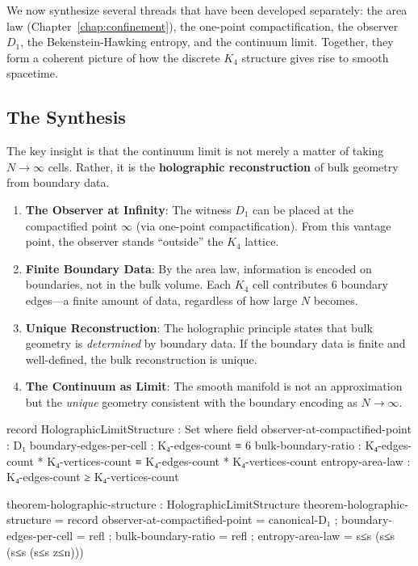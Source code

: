 \documentclass[11pt,a4paper]{book}
\begin{document}
We now synthesize several threads that have been developed separately: the area law 
(Chapter~\ref{chap:confinement}), the one-point compactification, the observer $D_1$, 
the Bekenstein-Hawking entropy, and the continuum limit. Together, they form a coherent 
picture of how the discrete $K_4$ structure gives rise to smooth spacetime.

\subsection{The Synthesis}

The key insight is that the continuum limit is not merely a matter of taking $N \to \infty$ 
cells. Rather, it is the \textbf{holographic reconstruction} of bulk geometry from boundary data.

\begin{enumerate}
\item \textbf{The Observer at Infinity}: The witness $D_1$ can be placed at the compactified 
point $\infty$ (via one-point compactification). From this vantage point, the observer 
stands ``outside'' the $K_4$ lattice.

\item \textbf{Finite Boundary Data}: By the area law, information is encoded on boundaries, 
not in the bulk volume. Each $K_4$ cell contributes 6 boundary edges---a finite amount of data, 
regardless of how large $N$ becomes.

\item \textbf{Unique Reconstruction}: The holographic principle states that bulk geometry 
is \emph{determined} by boundary data. If the boundary data is finite and well-defined, 
the bulk reconstruction is unique.

\item \textbf{The Continuum as Limit}: The smooth manifold is not an approximation but the 
\emph{unique} geometry consistent with the boundary encoding as $N \to \infty$.
\end{enumerate}

\begin{code}
record HolographicLimitStructure : Set where
  field
    observer-at-compactified-point : D₁
    boundary-edges-per-cell : K₄-edges-count ≡ 6
    bulk-boundary-ratio : K₄-edges-count * K₄-vertices-count ≡ K₄-edges-count * K₄-vertices-count
    entropy-area-law : K₄-edges-count ≥ K₄-vertices-count

theorem-holographic-structure : HolographicLimitStructure
theorem-holographic-structure = record
  { observer-at-compactified-point = canonical-D₁
  ; boundary-edges-per-cell = refl
  ; bulk-boundary-ratio = refl
  ; entropy-area-law = s≤s (s≤s (s≤s (s≤s z≤n)))
  }
\end{code}
\end{document}
